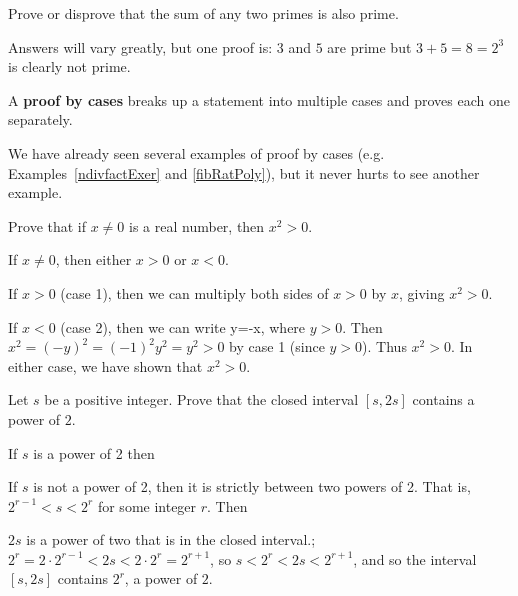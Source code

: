 \begin{exer}
Prove or disprove that the sum of any two primes is also prime.\\
\pflinethree
\begin{answer}
Answers will vary greatly, but one proof is: $3$ and $5$ are prime but $3+5=8=2^3$ is clearly not prime.
\end{answer}
\end{exer}

\begin{df}
A {\bf proof by cases} breaks up a statement into multiple cases and proves each one separately.
\end{df}

We have already seen several examples of proof by cases (e.g. Examples~\ref{ndivfactExer} and \ref{fibRatPoly}), but
it never hurts to see another example.
\begin{exa}
Prove that if $x\neq 0$ is a real number, then $x^2>0$.
\begin{pf}
If $x\neq 0$, then either  $x>0$ or $x<0$.

If $x>0$ (case 1), then we can multiply both sides of $x>0$ by $x$, giving $x^2>0$.

If $x<0$ (case 2), then we can write y=-x, where $y>0$.  Then $x^2=(-y)^2=(-1)^2y^2=y^2>0$
by case 1 (since $y>0$).  Thus $x^2>0$.
In either case, we have shown that $x^2>0$.
\end{pf}
\end{exa}

\begin{fib}
Let $s$ be a positive integer. Prove that the closed interval
$[s,2s]$ contains a power of $2$.
\begin{pf}
If $s$ is a power of 2 then \blanklinefill

If $s$ is not a power of 2, then it is strictly between two powers of 2.
That is, $2^{r-1} < s < 2^r$ for some integer $r$.  Then \blanklinefill

\blanklinefill

\blanklinefill

\end{pf}
\begin{answer}  $2s$ is a power of two that is in the closed interval.;
$2^r=2\cdot 2^{r-1}< 2s<2\cdot 2^r=2^{r+1}$, so 
$s< 2^r < 2s < 2^{r+1}$, and so the interval $[s,2s]$ contains $2^r$, 
a power of $2$.
\end{answer}
\end{fib}

\newpage
